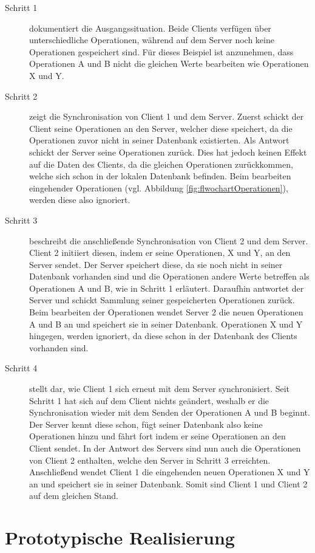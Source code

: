 \documentclass[a4paper, 12pt]{scrreprt}
\begin{document}
\begin{description}
	\item[Schritt 1] dokumentiert die Ausgangssituation. Beide Clients verfügen über unterschiedliche Operationen, während auf dem Server noch keine Operationen gespeichert sind. Für dieses Beispiel ist anzunehmen, dass Operationen A und B nicht die gleichen Werte bearbeiten wie Operationen X und Y.
	\item[Schritt 2] zeigt die Synchronisation von Client 1 und dem Server. Zuerst schickt der Client seine Operationen an den Server, welcher diese speichert, da die Operationen zuvor nicht in seiner Datenbank existierten. Als Antwort schickt der Server seine Operationen zurück. Dies hat jedoch keinen Effekt auf die Daten des Clients, da die gleichen Operationen zurückkommen, welche sich schon in der lokalen Datenbank befinden. Beim bearbeiten eingehender Operationen (vgl. Abbildung \ref{fig:flwochartOperationen}), werden diese also ignoriert.
	\item[Schritt 3] beschreibt die anschließende Synchronisation von Client 2 und dem Server. Client 2 initiiert diesen, indem er seine Operationen, X und Y, an den Server sendet. Der Server speichert diese, da sie noch nicht in seiner Datenbank vorhanden sind und die Operationen andere Werte betreffen als Operationen A und B, wie in Schritt 1 erläutert. Daraufhin antwortet der Server und schickt Sammlung seiner gespeicherten Operationen zurück. Beim bearbeiten der Operationen wendet Server 2 die neuen Operationen A und B an und speichert sie in seiner Datenbank. Operationen X und Y hingegen, werden ignoriert, da diese schon in der Datenbank des Clients vorhanden sind.
	\item[Schritt 4] stellt dar, wie Client 1 sich erneut mit dem Server synchronisiert. Seit Schritt 1 hat sich auf dem Client nichts geändert, weshalb er die Synchronisation wieder mit dem Senden der Operationen A und B beginnt. Der Server kennt diese schon, fügt seiner Datenbank also keine Operationen hinzu und fährt fort indem er seine Operationen an den Client sendet. In der Antwort des Servers sind nun auch die Operationen von Client 2 enthalten, welche den Server in Schritt 3 erreichten. Anschließend wendet Client 1 die eingehenden neuen Operationen X und Y an und speichert sie in seiner Datenbank. Somit sind Client 1 und Client 2 auf dem gleichen Stand. 
\end{description} 

\chapter{Prototypische Realisierung}
\end{document}
